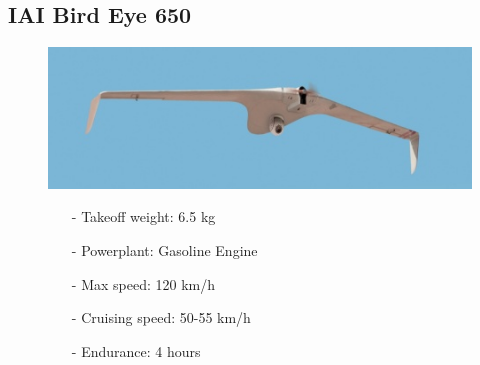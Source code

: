 \documentclass{article}
\begin{document}
\subsection{IAI Bird Eye 650}
\begin{figure}[h]
    \begin{minipage}[b]{.45\linewidth}
        \centering
        \includegraphics[width=0.7\linewidth]{Aircraft pics/IAI Bird Eye 650.png}
    \end{minipage}\hfill
    \begin{minipage}[b]{0.45\linewidth}
        \begin{itemize}
            \item [-] Takeoff weight: 6.5 kg
            \item [-] Powerplant: Gasoline Engine
            \item [-] Max speed: 120 km/h 
            \item [-] Cruising speed: 50-55 km/h 
            \item [-] Endurance: 4 hours
        \end{itemize}
    \end{minipage}
\end{figure}

\vspace{\fill}
\end{document}
